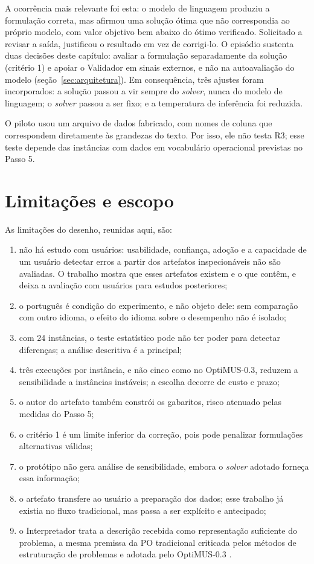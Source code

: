 A ocorrência mais relevante foi esta: o modelo de linguagem produziu a formulação correta, mas afirmou uma solução ótima que não correspondia ao próprio modelo, com valor objetivo bem abaixo do ótimo verificado. Solicitado a revisar a saída, justificou o resultado em vez de corrigi-lo. O episódio sustenta duas decisões deste capítulo: avaliar a formulação separadamente da solução (critério 1) e apoiar o Validador em sinais externos, e não na autoavaliação do modelo (seção~\ref{sec:arquitetura}). Em consequência, três ajustes foram incorporados: a solução passou a vir sempre do \textit{solver}, nunca do modelo de linguagem; o \textit{solver} passou a ser fixo; e a temperatura de inferência foi reduzida.

O piloto usou um arquivo de dados fabricado, com nomes de coluna que correspondem diretamente às grandezas do texto. Por isso, ele não testa R3; esse teste depende das instâncias com dados em vocabulário operacional previstas no Passo 5.

\section{Limitações e escopo}
\label{sec:limitacoes}

As limitações do desenho, reunidas aqui, são:

\begin{enumerate}[label=\alph*)]
  \item não há estudo com usuários: usabilidade, confiança, adoção e a capacidade de um usuário detectar erros a partir dos artefatos inspecionáveis não são avaliadas. O trabalho mostra que esses artefatos existem e o que contêm, e deixa a avaliação com usuários para estudos posteriores;
  \item o português é condição do experimento, e não objeto dele: sem comparação com outro idioma, o efeito do idioma sobre o desempenho não é isolado;
  \item com 24 instâncias, o teste estatístico pode não ter poder para detectar diferenças; a análise descritiva é a principal;
  \item três execuções por instância, e não cinco como no OptiMUS-0.3, reduzem a sensibilidade a instâncias instáveis; a escolha decorre de custo e prazo;
  \item o autor do artefato também constrói os gabaritos, risco atenuado pelas medidas do Passo 5;
  \item o critério 1 é um limite inferior da correção, pois pode penalizar formulações alternativas válidas;
  \item o protótipo não gera análise de sensibilidade, embora o \textit{solver} adotado forneça essa informação;
  \item o artefato transfere ao usuário a preparação dos dados; esse trabalho já existia no fluxo tradicional, mas passa a ser explícito e antecipado;
  \item o Interpretador trata a descrição recebida como representação suficiente do problema, a mesma premissa da PO tradicional criticada pelos métodos de estruturação de problemas \cite{rosenhead2006} e adotada pelo OptiMUS-0.3 \cite{ahmaditeshnizi2026}.
\end{enumerate}
